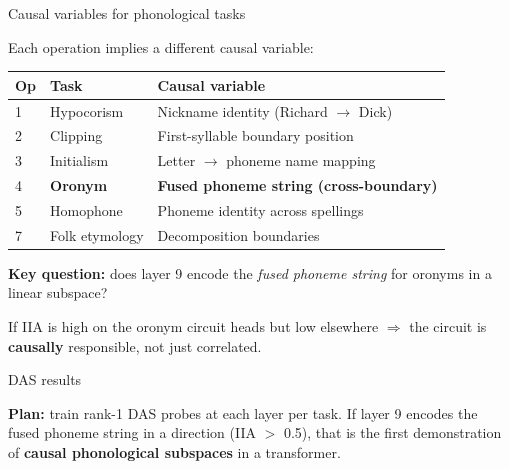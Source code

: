\documentclass[10pt,aspectratio=169]{beamer}
\begin{document}
\begin{frame}{Causal variables for phonological tasks}

\small
Each operation implies a different causal variable:

\vspace{0.5em}
\begin{center}
\renewcommand{\arraystretch}{1.2}
\begin{tabular}{lll}
\toprule
\textbf{Op} & \textbf{Task} & \textbf{Causal variable} \\
\midrule
1 & Hypocorism & Nickname identity (Richard $\to$ Dick) \\
2 & Clipping & First-syllable boundary position \\
3 & Initialism & Letter $\to$ phoneme name mapping \\
\rowcolor{fusion!8}
4 & \textbf{Oronym} & \textbf{Fused phoneme string (cross-boundary)} \\
5 & Homophone & Phoneme identity across spellings \\
7 & Folk etymology & Decomposition boundaries \\
\bottomrule
\end{tabular}
\end{center}

\vspace{0.5em}
\textbf{Key question:} does layer 9 encode the \emph{fused phoneme string} for oronyms in a linear subspace?

If IIA is high on the oronym circuit heads but low elsewhere $\Rightarrow$ the circuit is \textbf{causally} responsible, not just correlated.
\end{frame}

\begin{frame}{DAS results}
\hypertarget{sl:dasresults}{}

\begin{center}
\vfill
{}
\vfill
\end{center}

\vspace{0.3em}
\small
\textbf{Plan:} train rank-1 DAS probes at each layer per task. If layer 9 encodes the fused phoneme string in a direction (IIA $>$ 0.5), that is the first demonstration of \textbf{causal phonological subspaces} in a transformer.
\end{frame}
\end{document}
